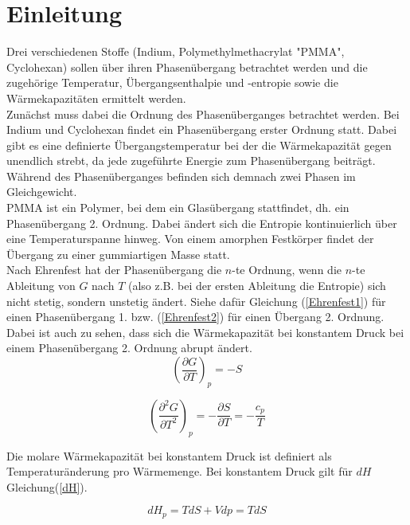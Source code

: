 \documentclass[12pt,a4paper,titlepage,headinclude,bibtotoc]{scrartcl}
\begin{document}
\section{Einleitung}
Drei verschiedenen Stoffe (Indium, Polymethylmethacrylat "PMMA", Cyclohexan) sollen über ihren Phasenübergang betrachtet werden und die zugehörige Temperatur, Übergangsenthalpie und -entropie sowie die Wärmekapazitäten ermittelt werden.\\
Zunächst muss dabei die Ordnung des Phasenüberganges betrachtet werden. Bei Indium und Cyclohexan findet ein Phasenübergang erster Ordnung statt. Dabei gibt es eine definierte Übergangstemperatur bei der die Wärmekapazität gegen unendlich strebt, da jede zugeführte Energie zum Phasenübergang beiträgt. Während des Phasenüberganges befinden sich demnach zwei Phasen im Gleichgewicht.\\
PMMA ist ein Polymer, bei dem ein Glasübergang stattfindet, dh. ein Phasenübergang 2. Ordnung. Dabei ändert sich die Entropie kontinuierlich über eine Temperaturspanne hinweg. Von einem amorphen Festkörper findet der Übergang zu einer gummiartigen Masse statt.\\ 
Nach Ehrenfest hat der Phasenübergang die $n$-te Ordnung, wenn die $n$-te Ableitung von $G$ nach $T$ (also z.B. bei der ersten Ableitung die Entropie) sich nicht stetig, sondern unstetig ändert. Siehe dafür Gleichung (\ref{Ehrenfest1}) für einen Phasenübergang 1. bzw. (\ref{Ehrenfest2}) für einen Übergang 2. Ordnung. Dabei ist auch zu sehen, dass sich die Wärmekapazität bei konstantem Druck  bei einem Phasenübergang 2. Ordnung abrupt ändert.\\ 


\begin{equation} \label{Ehrenfest1}
\left(\frac{\partial G}{\partial T}\right)_p = -S
\end{equation}  
  
\begin{equation} \label{Ehrenfest2}
\left(\frac{\partial^2 G}{\partial T^2}\right)_p = -\frac{\partial S}{\partial T}= - \frac{c_p}{T}
\end{equation}  


Die molare Wärmekapazität bei konstantem Druck ist definiert als Temperaturänderung pro Wärmemenge. Bei konstantem Druck gilt für $dH$ Gleichung(\ref{dH}). 

\begin{equation} \label{dH}
dH_p= TdS +Vdp =TdS
\end{equation}
\end{document}

